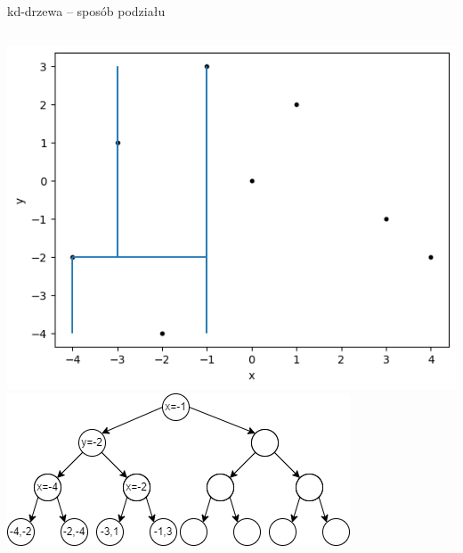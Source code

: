 \documentclass[aspectratio=169,dvipsnames]{beamer}
\begin{document}
\begin{frame}{kd-drzewa -- sposób podziału}
    \begin{columns}
        \includegraphics[width=\textwidth]{images/plots/5}
        \includegraphics[width=\textwidth]{images/trees/7.drawio}
    \end{columns}
\end{frame}
\end{document}
